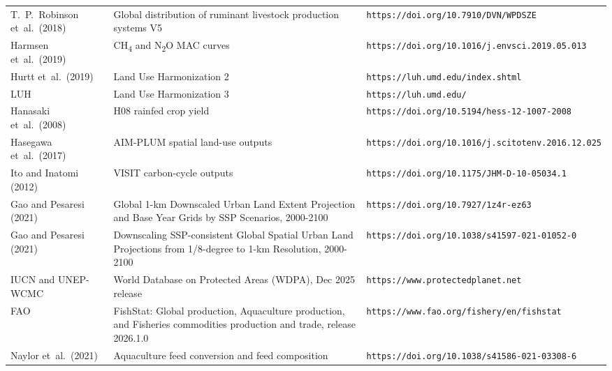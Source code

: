 \begin{xltabular}{\linewidth}{l X X}
  T.~P.~Robinson et~al.~(2018)~\cite{robinsonGlobalDistributionRuminant2018} & Global distribution of ruminant livestock production systems V5 & \nolinkurl{https://doi.org/10.7910/DVN/WPDSZE} \\
  Harmsen et~al.~(2019)~\cite{harmsenLongtermMarginalAbatement2019a}    & CH\textsubscript{4} and N\textsubscript{2}O MAC curves & \nolinkurl{https://doi.org/10.1016/j.envsci.2019.05.013} \\
  Hurtt et~al.~(2019)~\cite{hurttHarmonizationGlobalLand2020}      & Land Use Harmonization 2 & \nolinkurl{https://luh.umd.edu/index.shtml} \\
  LUH & Land Use Harmonization 3 & \nolinkurl{https://luh.umd.edu/} \\
  Hanasaki et~al.~(2008)~\cite{hanasakiIntegratedModelAssessment2008a,hanasakiIntegratedModelAssessment2008b} & H08 rainfed crop yield & \nolinkurl{https://doi.org/10.5194/hess-12-1007-2008} \\
  Hasegawa et~al.~(2017)~\cite{hasegawaGlobalLanduseAllocation2017} & AIM-PLUM spatial land-use outputs & \nolinkurl{https://doi.org/10.1016/j.scitotenv.2016.12.025} \\
  Ito and Inatomi (2012)~\cite{itoWaterUseEfficiencyTerrestrial2012} & VISIT carbon-cycle outputs & \nolinkurl{https://doi.org/10.1175/JHM-D-10-05034.1} \\
  Gao and Pesaresi (2021)~\cite{gaoGlobal1kmDownscaled2021} & Global 1-km Downscaled Urban Land Extent Projection and Base Year Grids by SSP Scenarios, 2000-2100 & \nolinkurl{https://doi.org/10.7927/1z4r-ez63} \\
  Gao and Pesaresi (2021)~\cite{gaoDownscalingSSPconsistent2021} & Downscaling SSP-consistent Global Spatial Urban Land Projections from 1/8-degree to 1-km Resolution, 2000-2100 & \nolinkurl{https://doi.org/10.1038/s41597-021-01052-0} \\
  IUCN and UNEP-WCMC~\cite{iucnUNEPWCMCWorldDatabase2025} & World Database on Protected Areas (WDPA), Dec 2025 release & \nolinkurl{https://www.protectedplanet.net} \\
  FAO~\cite{faoFishStat2026} & FishStat: Global production, Aquaculture production, and Fisheries commodities production and trade, release 2026.1.0 & \nolinkurl{https://www.fao.org/fishery/en/fishstat} \\
  Naylor et~al.~(2021)~\cite{naylorRetrospectiveReviewGlobal2021} & Aquaculture feed conversion and feed composition & \nolinkurl{https://doi.org/10.1038/s41586-021-03308-6} \\
\end{xltabular}

